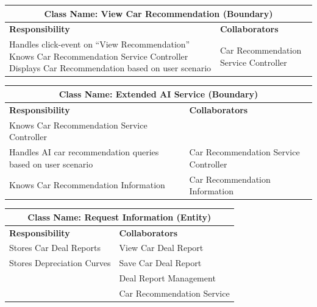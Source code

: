 \documentclass[]{article}
\begin{document}
\begin{itemize}
        \begin{table}[H]
        \centering
        \renewcommand{\arraystretch}{1.3} %
        \begin{tabular}{|p{6cm}|p{6cm}|} 
        \hline
        \multicolumn{2}{|c|}{\textbf{Class Name: View Car Recommendation (Boundary)}} \\ 
        \hline
        \textbf{Responsibility} & \textbf{Collaborators} \\ 
        \hline
        Handles click-event on “View Recommendation” \newline
        Knows Car Recommendation Service Controller \newline
        Displays Car Recommendation based on user scenario & Car Recommendation Service Controller \\ 
        \hline
        \end{tabular}
        \label{tab:crc_card}
        \end{table}
            
        \begin{table}[H]
        \centering
        \renewcommand{\arraystretch}{1.3} %
        \begin{tabular}{|p{6cm}|p{6cm}|} 
        \hline
        \multicolumn{2}{|c|}{\textbf{Class Name: Extended AI Service (Boundary)}} \\ 
        \hline
        \textbf{Responsibility} & \textbf{Collaborators} \\ 
        \hline
        Knows Car Recommendation Service Controller & \\
        Handles AI car recommendation queries based on user scenario & Car Recommendation Service Controller \\ 
        Knows Car Recommendation Information & Car Recommendation Information \\
        \hline
        \end{tabular}
        \label{tab:crc_card}
        \end{table}

        \begin{table}[H]
        \centering
        \renewcommand{\arraystretch}{1.3} %
        \begin{tabular}{|p{6cm}|p{6cm}|} 
        \hline
        \multicolumn{2}{|c|}{\textbf{Class Name: Request Information (Entity)}} \\ 
        \hline
        \textbf{Responsibility} & \textbf{Collaborators} \\ 
        \hline
        Stores Car Deal Reports & View Car Deal Report \\
        Stores Depreciation Curves & Save Car Deal Report \\
         & Deal Report Management \\
         & Car Recommendation Service \\
        \hline
        \end{tabular}
        \label{tab:crc_card}
        \end{table}


\end{itemize}
\end{document}
